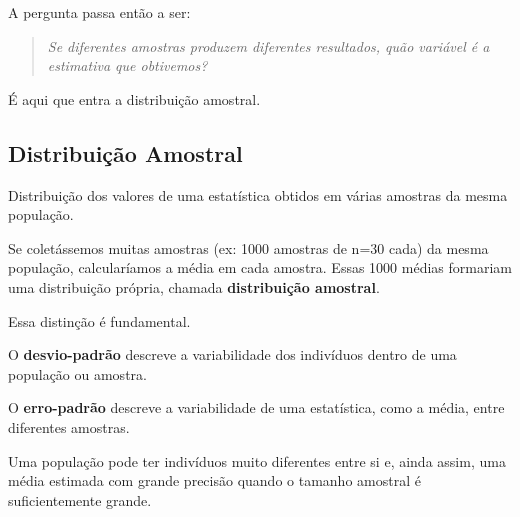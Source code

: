 A pergunta passa então a ser:

\begin{quote}
\textit{Se diferentes amostras produzem diferentes resultados, quão variável é a estimativa que obtivemos?}
\end{quote}

É aqui que entra a distribuição amostral.

\subsection{Distribuição Amostral}
\begin{definition}
Distribuição dos valores de uma estatística obtidos em várias amostras da mesma população.
\end{definition}

Se coletássemos muitas amostras (ex: 1000 amostras de n=30 cada) da mesma população, calcularíamos a média em cada amostra. Essas 1000 médias formariam uma distribuição própria, chamada \textbf{distribuição amostral}.


\begin{deepdive}

Essa distinção é fundamental.

O \textbf{desvio-padrão} descreve a variabilidade dos indivíduos dentro de uma população ou amostra.

O \textbf{erro-padrão} descreve a variabilidade de uma estatística, como a média, entre diferentes amostras.

Uma população pode ter indivíduos muito diferentes entre si e, ainda assim, uma média estimada com grande precisão quando o tamanho amostral é suficientemente grande.

\end{deepdive}

